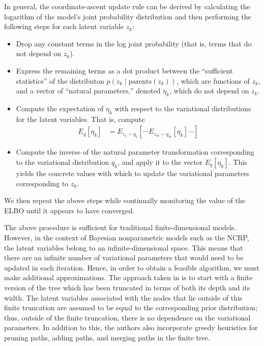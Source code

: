 \documentclass{article}
\begin{document}
In general, the coordinate-ascent update rule can be derived by calculating the logarithm of the model's joint probability distribution and then performing the following steps for each latent variable $z_k$:
\begin{itemize}
\item Drop any constant terms in the log joint probability (that is, terms that do not depend on $z_k$).
\item Express the remaining terms as a dot product between the ``sufficient statistics'' of the distributon $p(z_k \mid \text{parents}(z_k))$, which are functions of $z_k$, and a vector of ``natural parameters,'' denoted $\eta_k$, which do not depend on $z_k$.
\item Compute the expectation of $\eta_k$ with respect to the variational distributions for the latent variables.
That is, compute
\begin{align}
E_q[\eta_k] &= E_{z_1 \sim q_1} \left[ \cdots E_{z_m \sim q_m} \left[ \eta_k \right] \cdots \right]
\end{align}
\item Compute the inverse of the natural parameter transformation corresponding to the variational distribution $q_k$, and apply it to the vector $E_q[\eta_k]$.
This yields the concrete values with which to update the variational parameters corresponding to $z_k$.
\end{itemize}
We then repeat the above steps while continually monitoring the value of the ELBO until it appears to have converged.

The above procedure is sufficient for traditional finite-dimensional models.
However, in the context of Bayesian nonparametric models such as the NCRP, the latent variables belong to an infinite-dimensional space.
This means that there are an infinite number of variational parameters that would need to be updated in each iteration.
Hence, in order to obtain a feasible algorithm, we must make additional approximations.
The approach taken in \cite{wang2009vi_ncrp} is to start with a finite version of the tree which has been truncated in terms of both its depth and its width.
The latent variables associated with the nodes that lie outside of this finite truncation are assumed to be equal to the corresponding prior distribution; thus, outside of the finite truncation, there is no dependence on the variational parameters.
In addition to this, the authors also incorporate greedy heuristics for pruning paths, adding paths, and merging paths in the finite tree.
\end{document}
